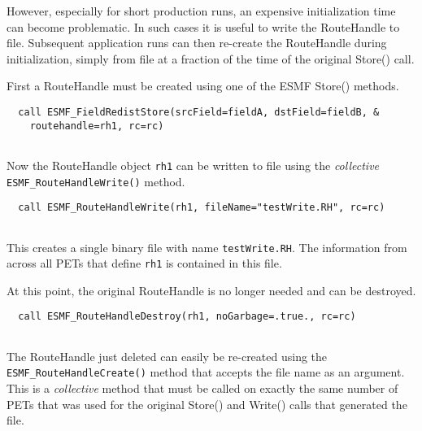    However, especially for short production runs, an expensive initialization
   time can become problematic. In such cases it is useful to write the
   RouteHandle to file. Subsequent application runs can then re-create the
   RouteHandle during initialization, simply from file at a fraction of the time
   of the original Store() call. 

   First a RouteHandle must be created using one of the ESMF Store() methods. 

 \begin{verbatim}
  call ESMF_FieldRedistStore(srcField=fieldA, dstField=fieldB, &
    routehandle=rh1, rc=rc)
 
\end{verbatim}
 

   Now the RouteHandle object {\tt rh1} can be written to file using the
   {\em collective} {\tt ESMF\_RouteHandleWrite()} method. 

 \begin{verbatim}
  call ESMF_RouteHandleWrite(rh1, fileName="testWrite.RH", rc=rc)
 
\end{verbatim}
 

   This creates a single binary file with name {\tt testWrite.RH}. The 
   information from across all PETs that define {\tt rh1} is contained in this
   file.
  
   At this point, the original RouteHandle is no longer needed and can be
   destroyed. 

 \begin{verbatim}
  call ESMF_RouteHandleDestroy(rh1, noGarbage=.true., rc=rc)
 
\end{verbatim}
 

   The RouteHandle just deleted can easily be re-created using the
   {\tt ESMF\_RouteHandleCreate()} method that accepts the file name as an 
   argument. This is a {\em collective} method that must be called on exactly
   the same number of PETs that was used for the original Store() and Write()
   calls that generated the file. 

